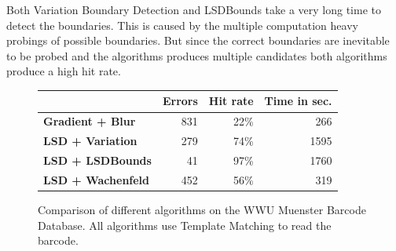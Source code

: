 Both Variation Boundary Detection and LSDBounds take a very long time to detect the boundaries. This is caused by the multiple computation heavy probings of possible boundaries. But since the correct boundaries are inevitable to be probed and the algorithms produces multiple candidates both algorithms produce a high hit rate.


\begin{figure}[t]
\center
\bgroup
\def\arraystretch{1.5}
\begin{tabular}{|l|r|r|r|}
\hline
&\textbf{Errors}&\textbf{Hit rate}&\textbf{Time in sec.}\\
\hline
\textbf{Gradient + Blur}& 831& 22\%& 266\\
\hline
\textbf{LSD + Variation}& 279& 74\%& 1595\\
\hline
\textbf{LSD + LSDBounds}& 41& 97\%& 1760\\
\hline
\textbf{LSD + Wachenfeld}& 452& 56\%& 319\\
\hline
\end{tabular}
\egroup
\caption{Comparison of different algorithms on the WWU Muenster Barcode Database. All algorithms use Template Matching to read the barcode.}
\label{laufzeit}
\end{figure}
 